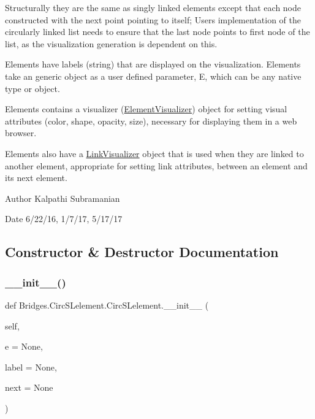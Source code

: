 Structurally they are the same as singly linked elements except that each node constructed with the next point pointing to itself; User\textquotesingle{}s implementation of the circularly linked list needs to ensure that the last node points to first node of the list, as the visualization generation is dependent on this.

Elements have labels (string) that are displayed on the visualization. Elements take an generic object as a user defined parameter, E, which can be any native type or object.

Elements contains a visualizer (\mbox{\hyperlink{namespace_bridges_1_1_element_visualizer}{Element\+Visualizer}}) object for setting visual attributes (color, shape, opacity, size), necessary for displaying them in a web browser.

Elements also have a \mbox{\hyperlink{namespace_bridges_1_1_link_visualizer}{Link\+Visualizer}} object that is used when they are linked to another element, appropriate for setting link attributes, between an element and its next element.

\begin{DoxyAuthor}{Author}
Kalpathi Subramanian
\end{DoxyAuthor}
\begin{DoxyDate}{Date}
6/22/16, 1/7/17, 5/17/17 
\end{DoxyDate}


\subsection{Constructor \& Destructor Documentation}
\mbox{\label{class_bridges_1_1_circ_s_lelement_1_1_circ_s_lelement_ae7e31a351fb3d4009cd5bc58eb0cdff4}} 
\subsubsection{\texorpdfstring{\+\_\+\+\_\+init\+\_\+\+\_\+()}{\_\_init\_\_()}}
{\footnotesize\ttfamily def Bridges.\+Circ\+S\+Lelement.\+Circ\+S\+Lelement.\+\_\+\+\_\+init\+\_\+\+\_\+ (\begin{DoxyParamCaption}\item[{}]{self,  }\item[{}]{e = {\ttfamily None},  }\item[{}]{label = {\ttfamily None},  }\item[{}]{next = {\ttfamily None} }\end{DoxyParamCaption})}



